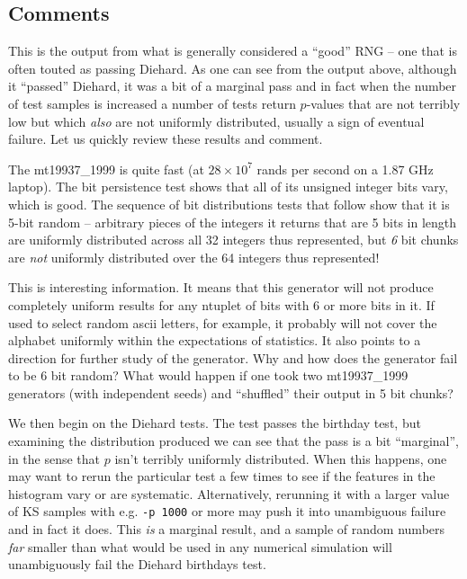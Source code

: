 \documentclass{book}
\begin{document}
\subsection{Comments}

This is the output from what is generally considered a ``good'' RNG --
one that is often touted as passing Diehard.  As one can see from the
output above, although it ``passed'' Diehard, it was a bit of a marginal
pass and in fact when the number of test samples is increased a number
of tests return $p$-values that are not terribly low but which {\em
also} are not uniformly distributed, usually a sign of eventual failure.
Let us quickly review these results and comment.

The mt19937\_1999 is quite fast (at $28\times10^7$ rands per second on a
1.87 GHz laptop).  The bit persistence test shows that all of its
unsigned integer bits vary, which is good.  The sequence of bit
distributions tests that follow show that it is 5-bit random --
arbitrary pieces of the integers it returns that are 5 bits in length
are uniformly distributed across all 32 integers thus represented, but
{\em 6} bit chunks are {\em not} uniformly distributed over the 64
integers thus represented!  

This is interesting information.  It means that this generator will not
produce completely uniform results for any ntuplet of bits with 6 or
more bits in it.  If used to select random ascii letters, for example,
it probably will not cover the alphabet uniformly within the
expectations of statistics.  It also points to a direction for further
study of the generator.  Why and how does the generator fail to be 6 bit
random?  What would happen if one took two mt19937\_1999 generators
(with independent seeds) and ``shuffled'' their output in 5 bit chunks?

We then begin on the Diehard tests.  The test passes the birthday test,
but examining the distribution produced we can see that the pass is a
bit ``marginal'', in the sense that $p$ isn't terribly uniformly
distributed.  When this happens, one may want to rerun the particular
test a few times to see if the features in the histogram vary or are
systematic.  Alternatively, rerunning it with a larger value of KS
samples with e.g. {\tt -p 1000} or more may push it into unambiguous
failure and in fact it does.  This {\em is} a marginal result, and a
sample of random numbers {\em far} smaller than what would be used in
any numerical simulation will unambiguously fail the Diehard birthdays
test.
\end{document}
